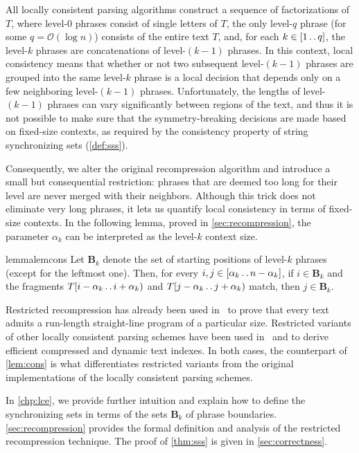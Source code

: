 \documentclass[a4paper]{article}
\theoremstyle{definition}
\theoremstyle{remark}
\newcommand{\B}{\mathbf{B}}
\newcommand{\dd}{\mathinner{\ldotp\ldotp}}
\newcommand{\Oh}{\mathcal{O}}
\begin{document}
All locally consistent parsing algorithms construct a sequence of factorizations of $T$, where
level-$0$ phrases consist of single letters of $T$, the only level-$q$ phrase (for some $q=\Oh(\log n)$) consists of the entire text $T$,
and, for each $k \in [1\dd q]$, the level-$k$ phrases are concatenations of level-$(k-1)$ phrases.
In this context, local consistency means that whether or not two subsequent level-$(k-1)$ phrases are grouped into the same level-$k$ phrase 
is a local decision that depends only on a few neighboring  level-$(k-1)$ phrases.
Unfortunately, the lengths of level-$(k-1)$ phrases can vary significantly between regions of the text, and thus it is not possible to make sure that the symmetry-breaking decisions are made based on fixed-size contexts, as required by the consistency property of string synchronizing sets (\cref{def:sss}).

Consequently, we alter the original recompression algorithm and introduce a small but consequential restriction: phrases that are deemed too long for their level are never merged with their neighbors. Although this trick does not eliminate very long phrases, it lets us quantify local consistency in terms of fixed-size contexts. In the following lemma, proved in \cref{sec:recompression}, the parameter $\alpha_k$ can be interpreted as the level-$k$ context size.
\begin{restatable}{lemma}{lemcons}\label{lem:cons}
Let $\B_k$ denote the set of starting positions of level-$k$ phrases (except for the leftmost one). 
Then, for every $i,j\in [\alpha_k\dd n-\alpha_k]$, if $i\in \B_k$ and the fragments $T[i-\alpha_k\dd i+\alpha_k)$ and $T[j-\alpha_k\dd j+\alpha_k)$ match, then $j\in \B_k$.
\end{restatable}

Restricted recompression has already been used in~\cite{DBLP:journals/tit/KociumakaNP23} to prove that every text admits a run-length straight-line program of a particular size.
Restricted variants of other locally consistent parsing schemes have been used in~\cite{DBLP:conf/latin/KociumakaNO22} and \cite{DBLP:conf/stoc/KempaK22} to derive efficient compressed and dynamic text indexes. In both cases, the counterpart of \cref{lem:cons} is what differentiates restricted variants from the original implementations of the locally consistent parsing schemes.

In \cref{chp:lce}, we provide further intuition and explain how to define the synchronizing sets in terms of the sets $\B_k$ of phrase boundaries.
\cref{sec:recompression} provides the formal definition and analysis of the restricted recompression technique.
The proof of \cref{thm:sss} is given in \cref{sec:correctness}.
\end{document}
